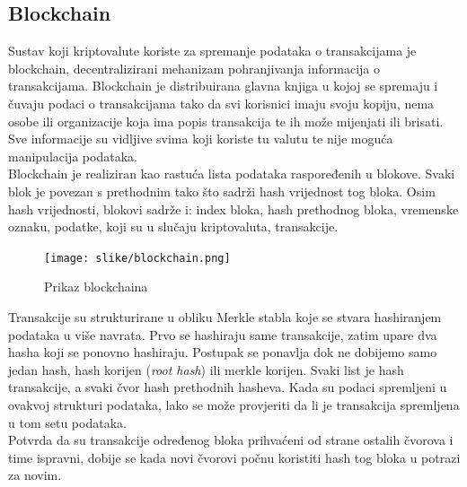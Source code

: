 \documentclass[12pt]{article}
\begin{document}
\subsection{Blockchain}
Sustav koji kriptovalute koriste za spremanje podataka o transakcijama je blockchain, decentralizirani mehanizam pohranjivanja informacija o transakcijama. Blockchain je distribuirana glavna knjiga u kojoj se spremaju i čuvaju podaci o transakcijama tako da svi korisnici imaju svoju kopiju, nema osobe ili organizacije koja ima popis transakcija te ih može mijenjati ili brisati. Sve informacije su vidljive svima koji koriste tu valutu te nije moguća manipulacija podataka. \\
Blockchain je realiziran kao rastuća lista podataka raspoređenih u blokove. Svaki blok je povezan s prethodnim tako što sadrži hash vrijednost tog bloka. Osim hash vrijednosti, blokovi sadrže i: index bloka, hash prethodnog bloka, vremenske oznaku, podatke, koji su u slučaju
kriptovaluta, transakcije. \\
\begin{figure}[h!]
	\centering
	\texttt{[image: slike/blockchain.png]}
	\caption{Prikaz blockchaina}
\end{figure}
Transakcije su strukturirane u obliku Merkle stabla koje se stvara hashiranjem podataka u više navrata. Prvo se hashiraju same transakcije, zatim upare dva hasha koji se ponovno hashiraju.
Postupak se ponavlja dok ne dobijemo samo jedan hash, hash korijen (\textit{root hash}) ili  merkle korijen. Svaki list je hash transakcije, a svaki čvor hash prethodnih hasheva. Kada su podaci spremljeni u ovakvoj strukturi podataka, lako se može provjeriti da li je transakcija spremljena u tom setu podataka. \\
Potvrda da su transakcije određenog bloka prihvaćeni od strane ostalih čvorova i time ispravni, dobije se kada novi čvorovi počnu koristiti hash tog bloka u potrazi za novim.
\end{document}
